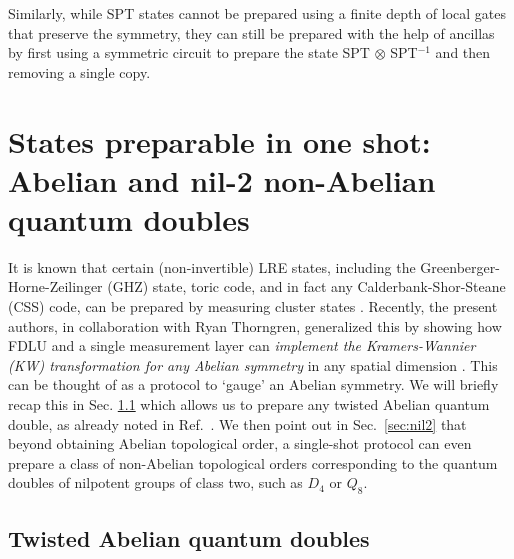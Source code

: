 \documentclass[nofootinbib,prx,twocolumn,showpacs,superscriptaddress,notitlepage,amsmath,amssymb]{revtex4-2}
\theoremstyle{definition}
\begin{document}
Similarly, while SPT states cannot be prepared using a finite depth of local gates that preserve the symmetry, they can still be prepared with the help of ancillas by first using a symmetric circuit to prepare the state SPT $\otimes$ SPT$^{-1}$ and then removing a single copy.

\section{States preparable in one shot: Abelian and nil-2 non-Abelian quantum doubles}\label{sec:oneshot}
It is known that certain (non-invertible) LRE states, including the Greenberger-Horne-Zeilinger (GHZ) state, toric code, and in fact any Calderbank-Shor-Steane (CSS) code, can be prepared by measuring cluster states \cite{Briegel01,Raussendorf05,Aguado08,Bolt16,Piroli21}. Recently, the present authors, in collaboration with Ryan Thorngren, generalized this by showing how FDLU and a single measurement layer can \emph{implement the Kramers-Wannier (KW) transformation for any Abelian symmetry} in any spatial dimension \cite{measureSPT}. This can be thought of as a protocol to `gauge' an Abelian symmetry. We will briefly recap this in Sec. \ref{sec:KWabelian} which allows us to prepare any twisted Abelian quantum double, as already noted in Ref.~. We then point out in Sec.~\ref{sec:nil2} that beyond obtaining Abelian topological order, a single-shot protocol can even prepare a class of non-Abelian topological orders corresponding to the quantum doubles of nilpotent groups of class two, such as $D_4$ or $Q_8$. 

\subsection{Twisted Abelian quantum doubles}\label{sec:KWabelian}
\end{document}
